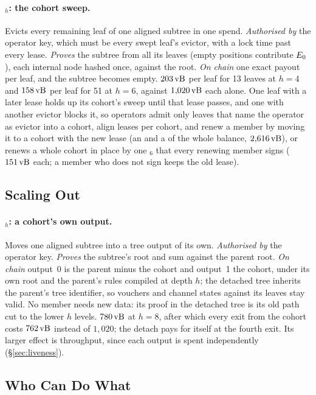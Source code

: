 \paragraph{$_h$: the cohort sweep.} Evicts every
remaining leaf of one aligned subtree in one spend. \emph{Authorised by}
the operator key, which must be every swept leaf's evictor, with a lock
time past every lease. \emph{Proves} the subtree from all its leaves
(empty positions contribute $E_0$), each internal node hashed once,
against the root. \emph{On chain} one exact payout per leaf, and the
subtree becomes empty. $203\,\mathrm{vB}$ per leaf for 13 leaves at $h = 4$ and
$158\,\mathrm{vB}$ per leaf for 51 at $h = 6$, against $1{,}020\,\mathrm{vB}$ each alone.
One leaf with a later lease holds up its cohort's sweep until that lease
passes, and one with another evictor blocks it, so operators admit only
leaves that name the operator as evictor into a cohort, align leases per
cohort, and renew a member by moving it to a cohort with the new lease
(an  and a  of the whole balance, $2{,}616\,\mathrm{vB}$),
or renews a whole cohort in place by one $_6$ that every
renewing member signs ($151\,\mathrm{vB}$ each; a member who does not sign keeps
the old lease).

\subsection{Scaling Out}

\paragraph{$_h$: a cohort's own output.} Moves one aligned
subtree into a tree output of its own. \emph{Authorised by} the operator
key. \emph{Proves} the subtree's root and sum against the parent root.
\emph{On chain} output~0 is the parent minus the cohort and output~1 the
cohort, under its own root and the parent's rules compiled at depth $h$;
the detached tree inherits the parent's tree identifier, so vouchers and
channel states against its leaves stay valid. No member needs new data:
its proof in the detached tree is its old path cut to the lower $h$
levels. $780\,\mathrm{vB}$ at $h = 8$, after which every exit from the cohort costs
$762\,\mathrm{vB}$ instead of $1{,}020$; the detach pays for itself at the fourth
exit. Its larger effect is throughput, since each output is spent
independently (\S\ref{sec:liveness}).

\subsection{Who Can Do What}

